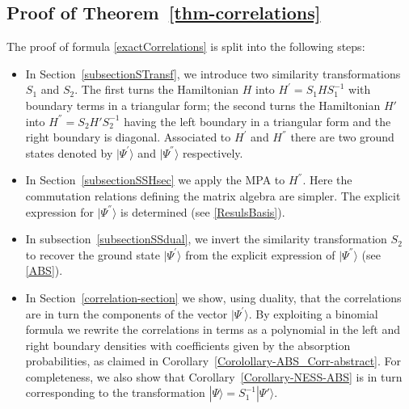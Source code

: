 \documentclass[10pt]{article}
\numberwithin{equation}{section}
\numberwithin{equation}{subsection}
\begin{document}
\subsection{Proof of Theorem~\ref{thm-correlations}}
The proof of formula \eqref{exactCorrelations} is split into the following steps:
\begin{itemize}
	\item In Section~\ref{subsectionSTransf}, we introduce two similarity transformations $S_1$ and  $S_2$. 
	 The first turns the Hamiltonian $H$ into $H^{'}= S_{1} H S_{1}^{-1} $ with boundary terms in a triangular form;
	 the second  turns the Hamiltonian $H'$ into $H^{''} = S_{2}H' S_{2}^{-1}$ having the left boundary in a triangular form and the right boundary is diagonal.
	Associated to $H^{'}$ and $H^{''}$ there are two ground states denoted by $|\Psi^{'}\rangle$ and $|\Psi^{''}\rangle$ respectively. 
	\item In Section~\ref{subsectionSSHsec} we apply the MPA to $H^{''}$. Here the commutation relations defining the matrix algebra are simpler. The explicit expression for $|\Psi^{''}\rangle$ is determined (see \eqref{ResulsBasis}).
	\item In subsection~\ref{subsectionSSdual}, we invert the similarity transformation $S_2$ to recover  the ground state $|\Psi^{'}\rangle$ from the explicit expression of $|\Psi^{''}\rangle$  (see \eqref{ABS}).
	\item In Section~\ref{correlation-section} we show, using duality, that the correlations are in turn the components of the vector $|\Psi^{'}\rangle$. By exploiting a binomial formula we rewrite the correlations in terms
	as a polynomial in the left and right boundary densities with coefficients given by the absorption probabilities, as claimed in Corollary~\ref{Corolollary-ABS_Corr-abstract}.
	For completeness, we also show that Corollary~\ref{Corollary-NESS-ABS} is in turn corresponding to the transformation $|\Psi\rangle = S_{1}^{-1} |\Psi'\rangle$.
	\end{itemize}
\end{document}
